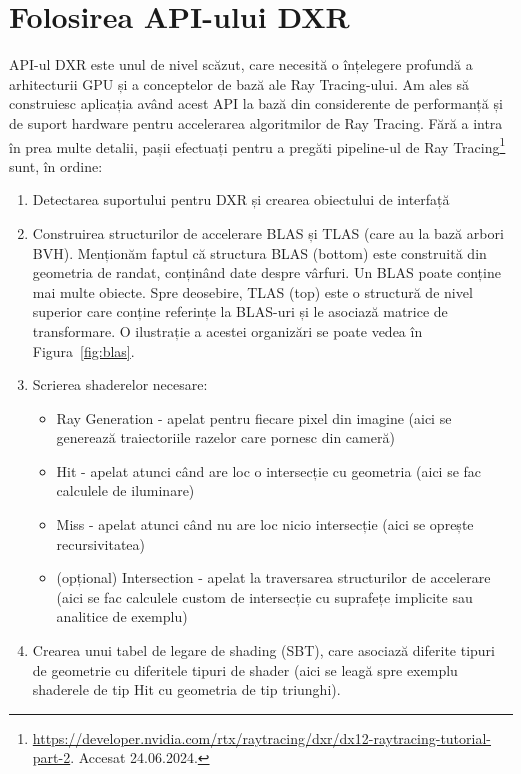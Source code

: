 \documentclass[12pt,a4paper]{report}
\numberwithin{equation}{section} %
\begin{document}
\section{Folosirea API-ului DXR}

API-ul DXR este unul de nivel scăzut, care necesită o înțelegere profundă a
arhitecturii GPU și a conceptelor de bază ale Ray Tracing-ului. Am ales să construiesc
aplicația având acest API la bază din considerente de performanță și de suport
hardware pentru accelerarea algoritmilor de Ray Tracing. Fără a intra în prea multe detalii,
pașii efectuați pentru a pregăti pipeline-ul de Ray Tracing\footnote{\url{https://developer.nvidia.com/rtx/raytracing/dxr/dx12-raytracing-tutorial-part-2}. Accesat 24.06.2024.} sunt, în ordine:
\begin{enumerate}
	\item Detectarea suportului pentru DXR și crearea obiectului de interfață
	\item Construirea structurilor de accelerare BLAS și TLAS (care au la bază arbori BVH). Menționăm
	faptul că structura BLAS (bottom) este construită din geometria de randat, conținând
	date despre vârfuri. Un BLAS poate conține mai multe obiecte. Spre deosebire, TLAS (top)
	este o structură de nivel superior care conține referințe la BLAS-uri și le asociază
	matrice de transformare. O ilustrație a acestei organizări se poate vedea în Figura~\ref{fig:blas}.
	\item Scrierea shaderelor necesare:
	\begin{itemize}
		\item Ray Generation - apelat pentru fiecare pixel din imagine (aici se generează traiectoriile razelor care pornesc din cameră)
		\item Hit - apelat atunci când are loc o intersecție cu geometria (aici se fac calculele de iluminare)
		\item Miss - apelat atunci când nu are loc nicio intersecție (aici se oprește recursivitatea)
		\item (opțional) Intersection - apelat la traversarea structurilor de accelerare (aici se fac calculele custom de intersecție cu suprafețe implicite sau analitice de exemplu)
	\end{itemize}
	\item Crearea unui tabel de legare de shading (SBT), care asociază diferite tipuri de geometrie cu diferitele tipuri de shader
	(aici se leagă spre exemplu shaderele de tip Hit cu geometria de tip triunghi).
\end{enumerate}
\end{document}
